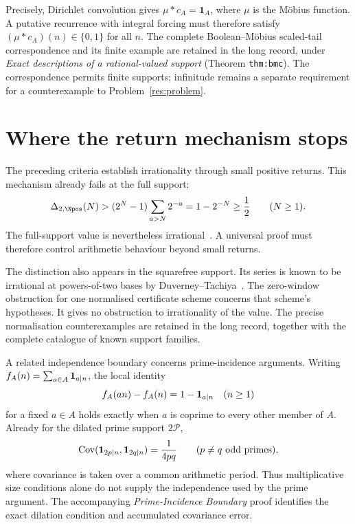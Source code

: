 \documentclass[11pt]{article}
\begin{document}
Precisely, Dirichlet convolution gives
$\mu*c_A=\mathbf1_A$, where $\mu$ is the M\"obius function.
A putative recurrence with integral forcing must therefore satisfy
$(\mu*c_A)(n)\in\{0,1\}$ for all $n$.
The complete Boolean--M\"obius scaled-tail correspondence and its
finite example are retained in the long record, under
\emph{Exact descriptions of a rational-valued support} (Theorem \texttt{thm:bmc}).
The correspondence permits finite supports; infinitude remains a separate
requirement for a counterexample to Problem~\ref{res:problem}.

\section{Where the return mechanism stops}\label{sec:map}
The preceding criteria establish irrationality through small positive
returns.  This mechanism already fails at the full support:
\[
 \Delta_{2,\Npos}(N)
 >(2^N-1)\sum_{a>N}2^{-a}=1-2^{-N}\ge\frac12
 \qquad(N\ge1).
\]
The full-support value is nevertheless irrational~\cite{erdos1968}.
A universal proof must therefore control arithmetic behaviour beyond
small returns.

The distinction also appears in the squarefree support.  Its series is
known to be irrational at powers-of-two bases by
Duverney--Tachiya~\cite[Corollary~1.2 and Example~1.1]{duverneytachiya}.
The zero-window obstruction for one normalised certificate scheme concerns
that scheme's hypotheses.  It gives no obstruction to irrationality of the
value.  The precise normalisation counterexamples are retained in the
long record, together with the complete catalogue of known support families.

A related independence boundary concerns prime-incidence arguments.
Writing $f_A(n)=\sum_{a\in A}{\bf1}_{a\mid n}$, the local identity
\[
 f_A(an)-f_A(n)=1-{\bf1}_{a\mid n}\quad(n\ge1)
\]
for a fixed $a\in A$ holds exactly when $a$ is coprime to every other
member of $A$.  Already for the dilated prime support $2\mathcal P$,
\[
 \operatorname{Cov}({\bf1}_{2p\mid n},{\bf1}_{2q\mid n})
 =\frac1{4pq}\qquad(p\ne q\text{ odd primes}),
\]
where covariance is taken over a common arithmetic period.
Thus multiplicative size conditions alone do not supply the independence
used by the prime argument.  The accompanying \emph{Prime-Incidence
Boundary} proof identifies the exact dilation condition and accumulated
covariance error.
\end{document}
